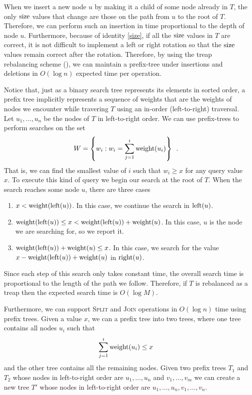 When we insert a new node $u$ by making it a child of some node
already in $T$, the only $\mathrm{size}$ values that change are those on the
path from $u$ to the root of $T$.  Therefore, we can perform such an
insertion in time proportional to the depth of node $u$.  Furthermore,
because of identity \eqref{size}, if all the $\mathrm{size}$ values in $T$ are
correct, it is not difficult to implement a left or right rotation so
that the $\mathrm{size}$ values remain correct after the rotation.  Therefore, by
using the treap rebalancing scheme (), we can maintain
a prefix-tree under insertions and deletions in $O(\log n)$ expected
time per operation.

Notice that, just as a binary search tree represents its elements in
sorted order, a prefix tree implicitly represents a sequence of
weights that are the weights of nodes we encounter while travering $T$
using an in-order (left-to-right) traversal.  Let $u_1,\ldots,u_n$ be
the nodes of $T$ in left-to-right order.  We can use prefix-trees to
perform searches on the set 
\[
W = \left\{ w_i : w_i = \sum_{j=1}^i \mathrm{weight}(u_i) \right\} \enspace .
\]
That is, we can find the smallest value of $i$ such that $w_i\ge x$
for any query value $x$.  To execute this kind of query we begin our
search at the root of $T$.  When the search reaches some node $u$,
there are three cases

\begin{enumerate}
\item $x < \mathrm{weight}(\mathrm{left}(u))$.  In this case, we continue the search in
  $\mathrm{left}(u)$.

\item $\mathrm{weight}(\mathrm{left}(u)) \le x < \mathrm{weight}(\mathrm{left}(u)) + \mathrm{weight}(u)$.  In this
  case, $u$ is the node we are searching for, so we report it.

\item $\mathrm{weight}(\mathrm{left}(u)) + \mathrm{weight}(u) \le x$.  In this case, we search
  for the value $x - \mathrm{weight}(\mathrm{left}(u)) + \mathrm{weight}(u)$ in $\mathrm{right}(u)$.
\end{enumerate}

Since each step of this search only takes constant time, the overall
search time is proportional to the length of the path we follow.
Therefore, if $T$ is rebalanced as a treap then the expected search
time is $O(\log M)$.

Furthermore, we can support \textsc{Split} and \textsc{Join}
operations in $O(\log n)$ time using prefix trees.  Given a value $x$,
we can a prefix tree into two trees, where one tree contains all nodes
$u_i$ such that
\[ \sum_{j=1}^i\mathrm{weight}(u_i) \le x
\]
 and the other tree contains all the remaining nodes.  Given two
prefix trees $T_1$ and $T_2$ whose nodes in left-to-right order are
$u_1,\ldots,u_n$ and $v_1,\ldots,v_m$ we can create a new tree $T'$
whose nodes in left-to-right order are
$u_1,\ldots,u_n,v_1,\ldots,v_n$.

